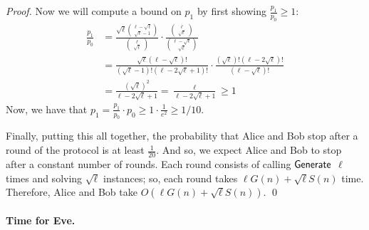 \begin{proof}
	Now we will compute a bound on $p_1$ by first showing $\frac{p_1}{p_0} \ge 1$:
	\begin{align*}
	\frac{p_1}{p_0} &= \frac{\sqrt \ell \binom{\ell - \sqrt \ell}{\sqrt \ell - 1}}{\binom \ell {\sqrt \ell}} \cdot \frac{\binom \ell {\sqrt \ell}}{ \binom {\ell - \sqrt \ell}{\sqrt \ell} }\\
	&= \frac{\sqrt \ell (\ell - \sqrt \ell)!}{(\sqrt \ell - 1)!(\ell - 2\sqrt \ell + 1)!} \cdot \frac{(\sqrt \ell)!(\ell - 2\sqrt \ell)!}{(\ell - \sqrt \ell)!}\\
	&= \frac{(\sqrt \ell)^2}{\ell - 2 \sqrt \ell + 1} = \frac{\ell}{\ell - 2\sqrt \ell + 1} \ge 1
	\end{align*}
	Now, we have that $p_1 = \frac{p_1}{p_0} \cdot p_0 \ge 1 \cdot \frac{1}{e^2} \ge 1 / 10$.
	
	Finally, putting this all together, the probability that Alice and Bob stop after a round of the protocol is at least $\frac 1 {20}$. And so, we expect Alice and Bob to stop after a constant number of rounds. Each round consists of calling $\mathsf{Generate}$ $\ell$ times and solving $\sqrt{\ell}$ instances; so, each round takes $\ell G(n) + \sqrt{\ell}S(n)$ time. Therefore, Alice and Bob take $O(\ell G(n) + \sqrt{\ell}S(n))$.
	\qed
\end{proof}

\paragraph{Time for Eve.}


